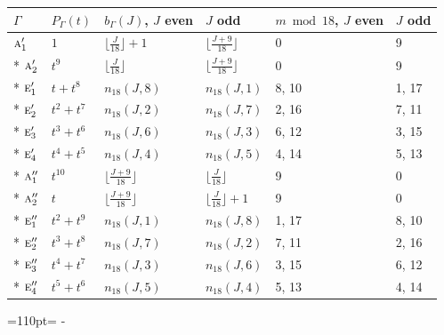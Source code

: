 \documentclass[10pt,a4paper]{article}
\newcommand{\needspace}[1]{\par\penalty-100\begingroup\dimen0=#1\relax\dimen2=\pagegoal
  \advance\dimen2-\pagetotal\ifdim\dimen0>\dimen2\relax\ifdim\dimen2>0pt\vfil\break\fi\fi
  \endgroup}
\numberwithin{equation}{section}
\newcommand{\irr}[1]{\text{\normalfont\scshape #1}}
\begin{document}
{\small{\renewcommand{\arraystretch}{1.3}\begin{longtable}{@{}llllll@{}}\toprule
$\Gamma$ & $P_\Gamma(t)$ & $b_\Gamma(J)$, $J$ even & $J$ odd & $m \bmod 18$, $J$ even & $J$ odd\\\midrule\endhead
\bottomrule\endfoot\endlastfoot
$\irr{a}_{1}'$ & $1$ & $\bigl\lfloor\tfrac{J}{18}\bigr\rfloor + 1$ & $\bigl\lfloor\tfrac{J+9}{18}\bigr\rfloor$ & 0 & 9\\*
$\irr{a}_{2}'$ & $t^{9}$ & $\bigl\lfloor\tfrac{J}{18}\bigr\rfloor$ & $\bigl\lfloor\tfrac{J+9}{18}\bigr\rfloor$ & 0 & 9\\*
$\irr{e}_{1}'$ & $t + t^{8}$ & $n_{18}(J,8)$ & $n_{18}(J,1)$ & 8, 10 & 1, 17\\*
$\irr{e}_{2}'$ & $t^{2} + t^{7}$ & $n_{18}(J,2)$ & $n_{18}(J,7)$ & 2, 16 & 7, 11\\*
$\irr{e}_{3}'$ & $t^{3} + t^{6}$ & $n_{18}(J,6)$ & $n_{18}(J,3)$ & 6, 12 & 3, 15\\*
$\irr{e}_{4}'$ & $t^{4} + t^{5}$ & $n_{18}(J,4)$ & $n_{18}(J,5)$ & 4, 14 & 5, 13\\*
$\irr{a}_{1}''$ & $t^{10}$ & $\bigl\lfloor\tfrac{J+9}{18}\bigr\rfloor$ & $\bigl\lfloor\tfrac{J}{18}\bigr\rfloor$ & 9 & 0\\*
$\irr{a}_{2}''$ & $t$ & $\bigl\lfloor\tfrac{J+9}{18}\bigr\rfloor$ & $\bigl\lfloor\tfrac{J}{18}\bigr\rfloor + 1$ & 9 & 0\\*
$\irr{e}_{1}''$ & $t^{2} + t^{9}$ & $n_{18}(J,1)$ & $n_{18}(J,8)$ & 1, 17 & 8, 10\\*
$\irr{e}_{2}''$ & $t^{3} + t^{8}$ & $n_{18}(J,7)$ & $n_{18}(J,2)$ & 7, 11 & 2, 16\\*
$\irr{e}_{3}''$ & $t^{4} + t^{7}$ & $n_{18}(J,3)$ & $n_{18}(J,6)$ & 3, 15 & 6, 12\\*
$\irr{e}_{4}''$ & $t^{5} + t^{6}$ & $n_{18}(J,5)$ & $n_{18}(J,4)$ & 5, 13 & 4, 14\\
\bottomrule\end{longtable}}}
\needspace{110pt}
\end{document}
